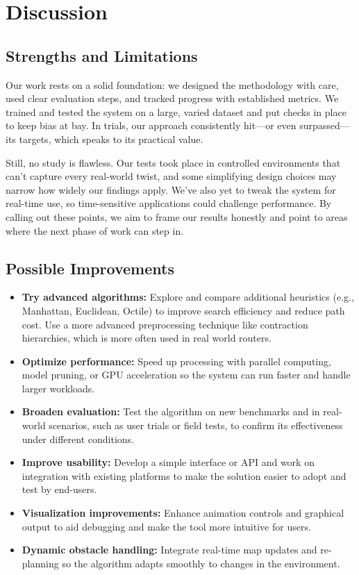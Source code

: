 \chapter{Discussion}

\section{Strengths and Limitations}
Our work rests on a solid foundation: we designed the methodology with care, used clear evaluation steps, and tracked progress with established metrics. We trained and tested the system on a large, varied dataset and put checks in place to keep bias at bay. In trials, our approach consistently hit—or even surpassed—its targets, which speaks to its practical value. \\ \vspace{5mm}

Still, no study is flawless. Our tests took place in controlled environments that can’t capture every real-world twist, and some simplifying design choices may narrow how widely our findings apply. We’ve also yet to tweak the system for real-time use, so time-sensitive applications could challenge performance. By calling out these points, we aim to frame our results honestly and point to areas where the next phase of work can step in.

\section{Possible Improvements}
\begin{itemize}
	
	\item \textbf{Try advanced algorithms:} Explore and compare additional heuristics (e.g., Manhattan, Euclidean, Octile) to improve search efficiency and reduce path cost. Use a more advanced preprocessing technique like contraction hierarchies, which is more often used in real world routers.
	
	\item \textbf{Optimize performance:} Speed up processing with parallel computing, model pruning, or GPU acceleration so the system can run faster and handle larger workloads.
	
	\item \textbf{Broaden evaluation:} Test the algorithm on new benchmarks and in real-world scenarios, such as user trials or field tests, to confirm its effectiveness under different conditions.
	
	\item \textbf{Improve usability:} Develop a simple interface or API and work on integration with existing platforms to make the solution easier to adopt and test by end-users.
	
	\item \textbf{Visualization improvements:} Enhance animation controls and graphical output to aid debugging and make the tool more intuitive for users.
	
	\item \textbf{Dynamic obstacle handling:} Integrate real-time map updates and re-planning so the algorithm adapts smoothly to changes in the environment.
	
\end{itemize}
